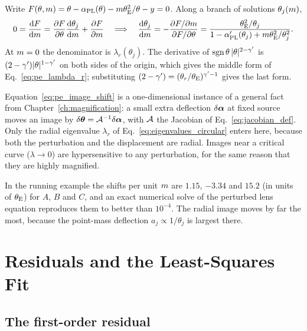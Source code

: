 \begin{derivation}
Write $F(\theta,m)=\theta-\alpha_{\rm PL}(\theta)-m\theta_{\mathrm{E}}^2/\theta-y=0$.
Along a branch of solutions $\theta_j(m)$,
\[
  0=\frac{\mathrm{d} F}{\mathrm{d} m}=\frac{\partial F}{\partial \theta}\frac{\mathrm{d} \theta_j}{\mathrm{d} m}+\frac{\partial F}{\partial m}
  \quad\Longrightarrow\quad
  \frac{\mathrm{d} \theta_j}{\mathrm{d} m}=-\frac{\partial F/\partial m}{\partial F/\partial\theta}
  =\frac{\theta_{\mathrm{E}}^2/\theta_j}{1-\alpha_{\rm PL}'(\theta_j)+m\theta_{\mathrm{E}}^2/\theta_j^2}.
\]
At $m=0$ the denominator is $\lambda_r(\theta_j)$. The derivative of
$\operatorname{sgn}\theta\,|\theta|^{2-\gamma'}$ is $(2-\gamma')|\theta|^{1-\gamma'}$
on both sides of the origin, which gives the middle form of
Eq.~\eqref{eq:pe_lambda_r}; substituting
$(2-\gamma')=(\theta_r/\theta_{\mathrm{E}})^{\gamma'-1}$ gives the last form.
\end{derivation}

\begin{bridge}
Equation~\eqref{eq:pe_image_shift} is a one-dimensional instance of a
general fact from Chapter~\ref{ch:magnification}: a small extra
deflection $\delta\boldsymbol{\alpha}$ at fixed source moves an image by
$\delta\boldsymbol{\theta}=\mathcal{A}^{-1}\delta\boldsymbol{\alpha}$, with $\mathcal{A}$ the Jacobian of
Eq.~\eqref{eq:jacobian_def}. Only the radial eigenvalue $\lambda_r$ of
Eq.~\eqref{eq:eigenvalues_circular} enters here, because both the
perturbation and the displacement are radial. Images near a critical
curve ($\lambda\to0$) are hypersensitive to any perturbation, for the
same reason that they are highly magnified.
\end{bridge}

In the running example the shifts per unit $m$ are $1.15$, $-3.34$
and $15.2$ (in units of $\theta_{\mathrm{E}}$) for $A$, $B$ and $C$, and an exact
numerical solve of the perturbed lens equation reproduces them to
better than $10^{-4}$. The radial image moves by far the most, because
the point-mass deflection $a_j\propto1/\theta_j$ is largest there.

\section{Residuals and the Least-Squares Fit}
\label{sec:pe_residuals}

\subsection{The first-order residual}

